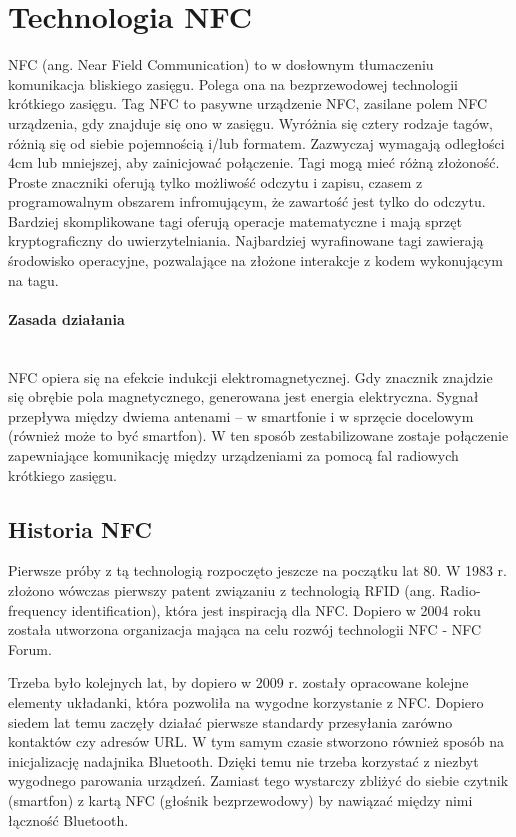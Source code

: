 \section{Technologia NFC}
NFC (ang. Near Field Communication) to w dosłownym tłumaczeniu komunikacja bliskiego zasięgu. Polega ona na bezprzewodowej technologii krótkiego zasięgu. Tag NFC to pasywne urządzenie NFC, zasilane polem NFC urządzenia, gdy znajduje się ono w zasięgu. Wyróżnia się cztery rodzaje tagów, różnią się od siebie pojemnością i/lub formatem.  Zazwyczaj wymagają odległości 4cm lub mniejszej, aby zainicjować połączenie.  Tagi mogą mieć różną złożoność. Proste znaczniki oferują tylko możliwość odczytu i zapisu, czasem z programowalnym obszarem infromującym, że zawartość jest tylko do odczytu. Bardziej skomplikowane tagi oferują operacje matematyczne i mają sprzęt kryptograficzny do uwierzytelniania. Najbardziej wyrafinowane tagi zawierają środowisko operacyjne, pozwalające na złożone interakcje z kodem wykonującym na tagu.
\paragraph{Zasada działania}\mbox{}\\
NFC opiera się na efekcie indukcji elektromagnetycznej. Gdy znacznik znajdzie się obrębie pola magnetycznego, generowana jest energia elektryczna. Sygnał przepływa między dwiema antenami – w smartfonie i w sprzęcie docelowym (również może to być smartfon). W ten sposób zestabilizowane zostaje połączenie zapewniające komunikację między urządzeniami za pomocą fal radiowych krótkiego zasięgu.
\subsection{Historia NFC}
Pierwsze próby z tą technologią rozpoczęto jeszcze na początku lat 80. W 1983 r. złożono wówczas pierwszy patent związaniu z technologią RFID (ang. Radio-frequency identification), która jest inspiracją dla NFC. Dopiero w 2004 roku została utworzona organizacja mająca na celu rozwój technologii NFC - NFC Forum.
\par
Trzeba było kolejnych lat, by dopiero w 2009 r. zostały opracowane kolejne elementy układanki, która pozwoliła na wygodne korzystanie z NFC. Dopiero siedem lat temu zaczęły działać pierwsze standardy przesyłania zarówno kontaktów czy adresów URL. W tym samym czasie stworzono również sposób na inicjalizację nadajnika Bluetooth. Dzięki temu nie trzeba korzystać z niezbyt wygodnego parowania urządzeń. Zamiast tego wystarczy zbliżyć do siebie czytnik (smartfon) z kartą NFC (głośnik bezprzewodowy) by nawiązać między nimi łączność Bluetooth.
